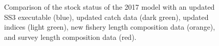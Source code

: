 \documentclass[
]{scrartcl}
\begin{document}
\begin{figure}


\caption{\label{fig-newdata_2}Comparison of the stock status of the 2017
model with an updated SS3 executable (blue), updated catch data (dark
green), updated indices (light green), new fishery length composition
data (orange), and survey length composition data (red).}

\end{figure}%
\end{document}
